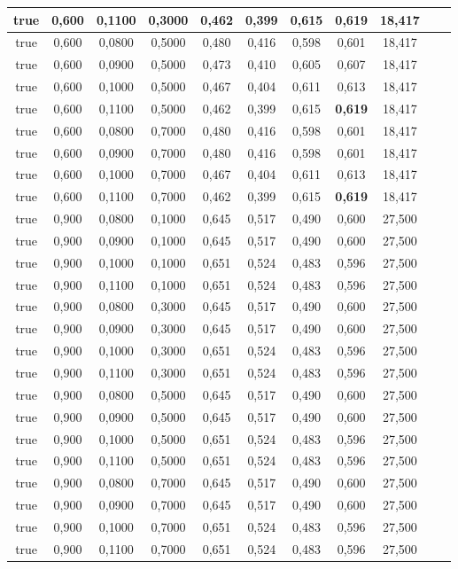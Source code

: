 \documentclass{article}
\begin{document}
\begin{longtable}[c]{|c|c|c|c|c|c|c|c|c|c|c|}
 true & 0,600 & 0,1100 & 0,3000 & 0,462 & 0,399 & 0,615 & \cellcolor{gray!20} \textbf{0,619} & 18,417  \\ \hline 
 true & 0,600 & 0,0800 & 0,5000 & 0,480 & 0,416 & 0,598 & 0,601 & 18,417  \\ \hline 
 true & 0,600 & 0,0900 & 0,5000 & 0,473 & 0,410 & 0,605 & 0,607 & 18,417  \\ \hline 
 true & 0,600 & 0,1000 & 0,5000 & 0,467 & 0,404 & 0,611 & 0,613 & 18,417  \\ \hline 
 true & 0,600 & 0,1100 & 0,5000 & 0,462 & 0,399 & 0,615 & \cellcolor{gray!20} \textbf{0,619} & 18,417  \\ \hline 
 true & 0,600 & 0,0800 & 0,7000 & 0,480 & 0,416 & 0,598 & 0,601 & 18,417  \\ \hline 
 true & 0,600 & 0,0900 & 0,7000 & 0,480 & 0,416 & 0,598 & 0,601 & 18,417  \\ \hline 
 true & 0,600 & 0,1000 & 0,7000 & 0,467 & 0,404 & 0,611 & 0,613 & 18,417  \\ \hline 
 true & 0,600 & 0,1100 & 0,7000 & 0,462 & 0,399 & 0,615 & \cellcolor{gray!20} \textbf{0,619} & 18,417  \\ \hline 
 true & 0,900 & 0,0800 & 0,1000 & 0,645 & 0,517 & 0,490 & 0,600 & 27,500  \\ \hline 
 true & 0,900 & 0,0900 & 0,1000 & 0,645 & 0,517 & 0,490 & 0,600 & 27,500  \\ \hline 
 true & 0,900 & 0,1000 & 0,1000 & 0,651 & 0,524 & 0,483 & 0,596 & 27,500  \\ \hline 
 true & 0,900 & 0,1100 & 0,1000 & 0,651 & 0,524 & 0,483 & 0,596 & 27,500  \\ \hline 
 true & 0,900 & 0,0800 & 0,3000 & 0,645 & 0,517 & 0,490 & 0,600 & 27,500  \\ \hline 
 true & 0,900 & 0,0900 & 0,3000 & 0,645 & 0,517 & 0,490 & 0,600 & 27,500  \\ \hline 
 true & 0,900 & 0,1000 & 0,3000 & 0,651 & 0,524 & 0,483 & 0,596 & 27,500  \\ \hline 
 true & 0,900 & 0,1100 & 0,3000 & 0,651 & 0,524 & 0,483 & 0,596 & 27,500  \\ \hline 
 true & 0,900 & 0,0800 & 0,5000 & 0,645 & 0,517 & 0,490 & 0,600 & 27,500  \\ \hline 
 true & 0,900 & 0,0900 & 0,5000 & 0,645 & 0,517 & 0,490 & 0,600 & 27,500  \\ \hline 
 true & 0,900 & 0,1000 & 0,5000 & 0,651 & 0,524 & 0,483 & 0,596 & 27,500  \\ \hline 
 true & 0,900 & 0,1100 & 0,5000 & 0,651 & 0,524 & 0,483 & 0,596 & 27,500  \\ \hline 
 true & 0,900 & 0,0800 & 0,7000 & 0,645 & 0,517 & 0,490 & 0,600 & 27,500  \\ \hline 
 true & 0,900 & 0,0900 & 0,7000 & 0,645 & 0,517 & 0,490 & 0,600 & 27,500  \\ \hline 
 true & 0,900 & 0,1000 & 0,7000 & 0,651 & 0,524 & 0,483 & 0,596 & 27,500  \\ \hline 
 true & 0,900 & 0,1100 & 0,7000 & 0,651 & 0,524 & 0,483 & 0,596 & 27,500  \\ \hline 
 \end{longtable} 
\end{document}
